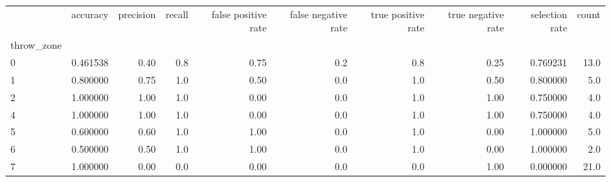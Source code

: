 \begin{tabular}{lrrrrrrrrr}
\toprule
{} &  accuracy &  precision &  recall &  false positive rate &  false negative rate &  true positive rate &  true negative rate &  selection rate &  count \\
throw\_zone &           &            &         &                      &                      &                     &                     &                 &        \\
\midrule
0          &  0.461538 &       0.40 &     0.8 &                 0.75 &                  0.2 &                 0.8 &                0.25 &        0.769231 &   13.0 \\
1          &  0.800000 &       0.75 &     1.0 &                 0.50 &                  0.0 &                 1.0 &                0.50 &        0.800000 &    5.0 \\
2          &  1.000000 &       1.00 &     1.0 &                 0.00 &                  0.0 &                 1.0 &                1.00 &        0.750000 &    4.0 \\
4          &  1.000000 &       1.00 &     1.0 &                 0.00 &                  0.0 &                 1.0 &                1.00 &        0.750000 &    4.0 \\
5          &  0.600000 &       0.60 &     1.0 &                 1.00 &                  0.0 &                 1.0 &                0.00 &        1.000000 &    5.0 \\
6          &  0.500000 &       0.50 &     1.0 &                 1.00 &                  0.0 &                 1.0 &                0.00 &        1.000000 &    2.0 \\
7          &  1.000000 &       0.00 &     0.0 &                 0.00 &                  0.0 &                 0.0 &                1.00 &        0.000000 &   21.0 \\
\bottomrule
\end{tabular}
